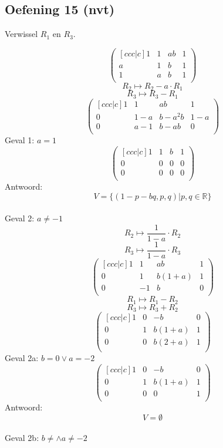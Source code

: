 \documentclass[lineaire_algebra_oplossingen.tex]{subfiles}
\begin{document}
\subsection{Oefening 15 (nvt)}
\begin{center}
Verwissel $R_1$ en $R_3$.
\end{center}
\[
\begin{pmatrix}[ccc|c]
1 & 1 & ab & 1\\
a & 1 & b & 1\\
1 & a & b & 1\\
\end{pmatrix}
\]
\[ R_2 \longmapsto R_2 - a\cdot R_1 \]
\[ R_3 \longmapsto R_3 - R_1 \]
\[
\begin{pmatrix}[ccc|c]
1 & 1 & ab & 1\\
0 & 1-a & b-a^2b & 1-a\\
0 & a-1 & b-ab & 0\\
\end{pmatrix}
\]
Geval 1: $a=1$
\[
\begin{pmatrix}[ccc|c]
1 & 1 & b & 1\\
0 & 0 & 0 & 0\\
0 & 0 & 0 & 0\\
\end{pmatrix}
\]
Antwoord:
\[
V = \{ (1-p-bq,p,q) | p,q \in \mathbb{R} \}
\]\\
Geval 2: $a \neq -1$
\[ R_2 \longmapsto \frac{1}{1-a}\cdot R_2 \]
\[ R_3 \longmapsto \frac{1}{1-a}\cdot R_3 \]
\[
\begin{pmatrix}[ccc|c]
1 & 1 & ab & 1\\
0 & 1 & b(1+a) & 1\\
0 & -1 & b & 0\\
\end{pmatrix}
\]
\[ R_1 \longmapsto R_1 - R_2 \]
\[ R_3 \longmapsto R_3 + R_2 \]
\[
\begin{pmatrix}[ccc|c]
1 & 0 & -b & 0\\
0 & 1 & b(1+a) & 1\\
0 & 0 & b(2+a) & 1\\
\end{pmatrix}
\]
Geval 2a: $b=0 \vee a=-2$
\[
\begin{pmatrix}[ccc|c]
1 & 0 & -b & 0\\
0 & 1 & b(1+a) & 1\\
0 & 0 & 0 & 1\\
\end{pmatrix}
\]
Antwoord:
\[
V=\emptyset
\]\\
Geval 2b: $b\neq \wedge a \neq -2$
\end{document}
